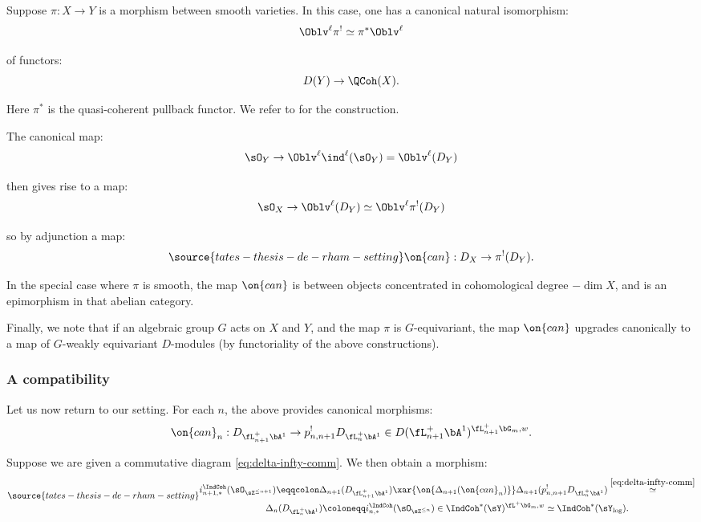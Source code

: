 Suppose $\pi:X \to Y$ is a morphism between smooth varieties. In this
case, one has a canonical natural isomorphism:
%
\[
\Oblv^{\ell} \pi^! \simeq \pi^*\Oblv^{\ell}
\]

 of functors:
%
\[
D(Y) \to \QCoh(X).
\]

 Here $\pi^*$ is the quasi-coherent pullback functor. We refer
to \cite{crystals} for the construction.

The canonical map:
%
\[
\sO_Y \to \Oblv^{\ell}\ind^{\ell}(\sO_Y) = \Oblv^{\ell}(D_Y)
\]

 then gives rise to a map:
%
\[
\sO_X \to \Oblv^{\ell}(D_Y) \simeq
\Oblv^{\ell}\pi^!(D_Y)
\]

 so by adjunction a map:
%
\begin{equation}\label{eq:can-x-y}
\source{tates-thesis-de-rham-setting}
\on{can}:D_X \to \pi^!(D_Y).
\end{equation}

In the special case where $\pi$ is smooth, the map $\on{can}$
is between objects concentrated in cohomological degree $-\dim X$, and
is an epimorphism in that abelian category.

Finally, we note that if an algebraic group $G$ acts on $X$ and $Y$, and the map
$\pi$ is $G$-equivariant, the map $\on{can}$ upgrades canonically to a map
of $G$-weakly equivariant $D$-modules (by functoriality of the above constructions).

\subsubsection{A compatibility}\label{sss:diff-compat}

Let us now return to our setting. For each $n$, the above
provides canonical morphisms:
%
\[
\on{can}_n:
D_{\fL_{n+1}^+ \bA^1} \to p_{n,n+1}^! D_{\fL_n^+ \bA^1} \in
D(\fL_{n+1}^+ \bA^1)^{\fL_{n+1}^+ \bG_m,w}.
\]

Suppose we are given a commutative diagram \eqref{eq:delta-infty-comm}.
We then obtain a morphism:
%
\begin{equation}\label{eq:delta-can-n}
\source{tates-thesis-de-rham-setting}
\begin{gathered}
i_{n+1,*}^{\IndCoh}(\sO_{\sZ^{\leq n+1}}) \eqqcolon
\Delta_{n+1}(D_{\fL_{n+1}^+ \bA^1}) \xar{\on{\Delta_{n+1}(\on{can}_n)}}
\Delta_{n+1}(p_{n,n+1}^! D_{\fL_n^+ \bA^1})
\overset{\eqref{eq:delta-infty-comm}}{\simeq} \\
\Delta_n(D_{\fL_n^+ \bA^1})
\coloneqq
i_{n,*}^{\IndCoh}(\sO_{\sZ^{\leq n}}) \in \IndCoh^*(\sY)^{\fL^+\bG_m,w} \simeq
\IndCoh^*(\sY_{\log}).
\end{gathered}
\end{equation}

